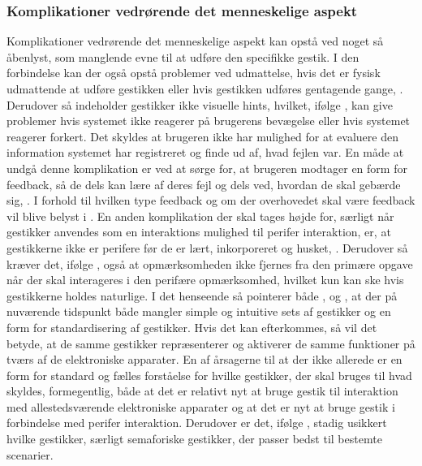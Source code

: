 \subsubsection{Komplikationer vedrørende det menneskelige aspekt}
\label{KomplikationerVedroerendeDetMenneskelige}
%
Komplikationer vedrørende det menneskelige aspekt kan opstå ved noget så åbenlyst, som manglende evne til at udføre den specifikke gestik. I den forbindelse kan der også opstå problemer ved udmattelse, hvis det er fysisk udmattende at udføre gestikken eller hvis gestikken udføres gentagende gange, \parencite[s. 28]{PDF:ATaxonomyOfGestures}. Derudover så indeholder gestikker ikke visuelle hints, hvilket, ifølge \textcite[s. 6]{PDF:NaturalUserInterfaces}, kan give problemer hvis systemet ikke reagerer på brugerens bevægelse eller hvis systemet reagerer forkert. Det skyldes at brugeren ikke har mulighed for at evaluere den information systemet har registreret og finde ud af, hvad fejlen var. En måde at undgå denne komplikation er ved at sørge for, at brugeren modtager en form for feedback, så de dels kan lære af deres fejl og dels ved, hvordan de skal gebærde sig, \parencite[s. 10]{PDF:NaturalUserInterfaces}. I forhold til hvilken type feedback og om der overhovedet skal være feedback vil blive belyst i . \blankline
%
En anden komplikation der skal tages højde for, særligt når gestikker anvendes som en interaktions mulighed til perifer interaktion, er, at gestikkerne ikke er perifere før de er lært, inkorporeret og husket, \parencite[s. 16]{PDF:PIEmbeddingHCIOnTheRelevance}. Derudover så kræver det, ifølge \textcite[s. 16]{PDF:PIEmbeddingHCIOnTheRelevance}, også at opmærksomheden ikke fjernes fra den primære opgave når der skal interageres i den perifære opmærksomhed, hvilket kun kan ske hvis gestikkerne holdes naturlige. I det henseende så pointerer både \textcite[s. 8]{PDF:NaturalUserInterfaces}, \textcite[s. 26]{PDF:ATaxonomyOfGestures} og \textcite[s. 19]{PDF:PIEmbeddingHCIOnTheRelevance}, at der på nuværende tidspunkt både mangler simple og intuitive sets af gestikker og en form for standardisering af gestikker. Hvis det kan efterkommes, så vil det betyde, at de samme gestikker repræsenterer og aktiverer de samme funktioner på tværs af de elektroniske apparater. En af årsagerne til at der ikke allerede er en form for standard og fælles forståelse for hvilke gestikker, der skal bruges til hvad skyldes, formegentlig, både at det er relativt nyt at bruge gestik til interaktion med allestedsværende elektroniske apparater og at det er nyt at bruge gestik i forbindelse med perifer interaktion. Derudover er det, ifølge \textcite[s. 28]{PDF:ATaxonomyOfGestures}, stadig usikkert hvilke gestikker, særligt semaforiske gestikker, der passer bedst til bestemte scenarier.

